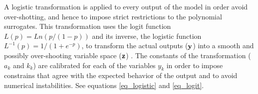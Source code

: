 \documentclass[preprint,12pt]{elsarticle}
\begin{document}
A logistic transformation is applied to every output of the model in order avoid over-shotting, and hence to impose strict restrictions to the polynomial surrogates. This transformation uses the logit function $L(p)=Ln(p/(1-p))$ and its inverse, the logistic function $L^{-1}(p) = 1/(1+e^{-p})$, to transform the actual outputs ($\mathbf{y}$) into a smooth and possibly over-shooting variable space ($\mathbf{z}$) \cite{simard1998transformation}. The constants of the transformation ($a_k$ and $k_k$) are calibrated for each of the variables $y_k$ in order to impose constrains that agree with the expected behavior of the output and to avoid numerical instabilities. See equations \ref{eq_logistic} and \ref{eq_logit}.



\begin{table}[!h]
\begin{centering}
\label{tab_logistic}
\caption{Logistic transformation constants for each output.}
\end{centering}
\end{table}
\end{document}
